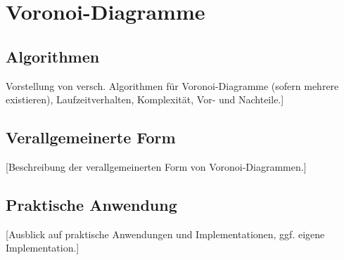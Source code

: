 \section{Voronoi-Diagramme}





\subsection{Algorithmen}
Vorstellung von versch. Algorithmen für Voronoi-Diagramme (sofern mehrere existieren), Laufzeitverhalten, Komplexität, Vor- und Nachteile.]

\subsection{Verallgemeinerte Form}
[Beschreibung der verallgemeinerten Form von Voronoi-Diagrammen.]

\subsection{Praktische Anwendung}
[Ausblick auf praktische Anwendungen und Implementationen, ggf. eigene Implementation.]
